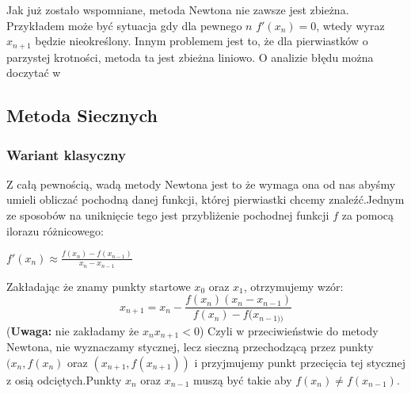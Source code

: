 \documentclass[11pt,wide]{article}
\begin{document}
Jak już zostało wspomniane, metoda Newtona nie zawsze jest zbieżna. Przykładem może być sytuacja gdy dla pewnego $n$ $f'(x_n) = 0$, wtedy wyraz $x_{n+1}$ będzie nieokreślony. Innym problemem jest to, że dla pierwiastków o parzystej krotności, metoda ta jest zbieżna liniowo. O analizie błędu można doczytać w \cite[s.73]{kincaidcheney}

\subsection{Metoda Siecznych}
\subsubsection{Wariant klasyczny}
Z całą pewnością, wadą metody Newtona jest to że wymaga ona od nas abyśmy umieli obliczać pochodną danej funkcji, której pierwiastki chcemy znaleźć.Jednym ze sposobów na uniknięcie tego jest przybliżenie pochodnej funkcji $f$ za pomocą ilorazu różnicowego:
\begin{center}
$f'(x_n) \approx \frac{f(x_n) - f(x_{n-1})}{x_n - x_{n-1}} $
\end{center}
Zakładając że znamy punkty startowe $x_0$ oraz $x_1$, otrzymujemy wzór:
\begin{equation}
x_{n+1} = x_n - \frac{f(x_n)(x_n - x_{n-1})}{f(x_n) - f(x_{n-1))}}
\end{equation}
(\textbf{Uwaga:} nie zakładamy że $x_{n}x_{n+1} < 0$)\newline
Czyli w przeciwieństwie do metody Newtona, nie wyznaczamy stycznej, lecz sieczną przechodzącą przez punkty $(x_n, f(x_n)$ oraz $(x_{n+1}, f(x_{n+1}))$ i przyjmujemy punkt przecięcia tej stycznej z osią odciętych.Punkty $x_n$ oraz $x_{n-1}$ muszą być takie aby $f(x_n) \neq f(x_{n-1})$.
\end{document}
